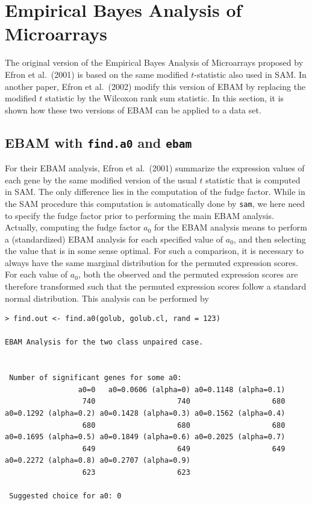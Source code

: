 \documentclass[a4paper]{article}
\begin{document}
\vspace*{18pt}

\section{Empirical Bayes Analysis of Microarrays}

The original version of the Empirical Bayes Analysis of
Microarrays proposed by Efron et al.\ (2001) is based on the same
modified $t$-statistic also used in SAM. In another paper,
Efron et al.\ (2002) modify this version of EBAM by replacing
the modified $t$ statistic by the Wilcoxon rank sum statistic. In
this section, it is shown how these two versions of EBAM can be
applied to a data set.

\subsection{EBAM with \texttt{find.a0} and \texttt{ebam}}

For their EBAM analysis, Efron et al.\ (2001) summarize the
expression values of each gene by the same modified version of the
usual $t$ statistic that is computed in SAM. The only difference
lies in the computation of the fudge factor. While in the SAM
procedure this computation is automatically done by \texttt{sam},
we here need to specify the fudge factor prior to performing the
main EBAM analysis. Actually, computing the fudge factor $a_0$ for
the EBAM analysis means to perform a (standardized) EBAM analysis
for each specified value of $a_0$, and then selecting the value
that is in some sense optimal. For such a comparison, it is
necessary to always have the same marginal distribution for the
permuted expression scores. For each value of $a_0$, both the
observed and the permuted expression scores are therefore
transformed such that the permuted expression scores follow a
standard normal distribution. This analysis can be performed by

\begin{verbatim}
> find.out <- find.a0(golub, golub.cl, rand = 123)

EBAM Analysis for the two class unpaired case.


 Number of significant genes for some a0:
                 a0=0   a0=0.0606 (alpha=0) a0=0.1148 (alpha=0.1)
                  740                   740                   680
a0=0.1292 (alpha=0.2) a0=0.1428 (alpha=0.3) a0=0.1562 (alpha=0.4)
                  680                   680                   680
a0=0.1695 (alpha=0.5) a0=0.1849 (alpha=0.6) a0=0.2025 (alpha=0.7)
                  649                   649                   649
a0=0.2272 (alpha=0.8) a0=0.2707 (alpha=0.9)
                  623                   623

 Suggested choice for a0: 0
\end{verbatim}
\end{document}
